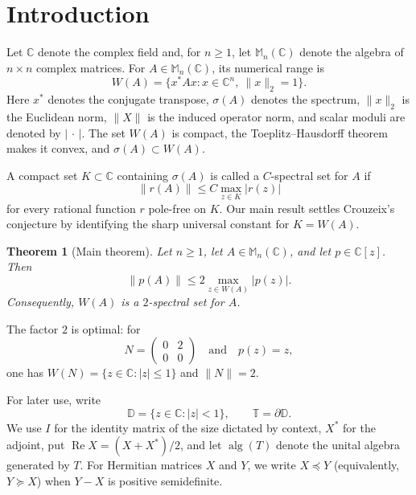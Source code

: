 \documentclass[preprints,article,submit,oneauthor]{Definitions/mdpi}
\newcounter{manuscriptresult}[section]
\theoremstyle{mdpi}
\newtheorem{theorem}[manuscriptresult]{Theorem}
\theoremstyle{definition}
\newcommand{\C}{\mathbb C}
\newcommand{\D}{\mathbb D}
\newcommand{\Torus}{\mathbb T}
\newcommand{\Mn}{\mathbb M_n(\C)}
\newcommand{\alg}{\operatorname{alg}}
\newcommand{\RePart}{\operatorname{Re}}
\begin{document}
\section{Introduction}
\label{sec:introduction}

Let $\C$ denote the complex field and, for $n\geq1$, let $\Mn$ denote
the algebra of $n\times n$ complex matrices.  For $A\in\Mn$, its
numerical range is
\begin{equation}
  W(A)=\{x^*Ax:x\in\C^n,\ \lVert x\rVert_2=1\}.
  \label{eq:numerical-range}
\end{equation}
Here $x^*$ denotes the conjugate transpose, $\sigma(A)$ denotes the
spectrum, $\lVert x\rVert_2$ is the Euclidean norm, $\lVert X\rVert$ is
the induced operator norm, and scalar moduli are denoted by
$\lvert\,\cdot\,\rvert$.  The set $W(A)$ is compact, the
Toeplitz--Hausdorff theorem makes it convex, and
$\sigma(A)\subset W(A)$.

A compact set $K\subset\C$ containing $\sigma(A)$ is called a
$C$-spectral set for $A$ if
\begin{equation}
  \lVert r(A)\rVert\leq C\max_{z\in K}\lvert r(z)\rvert
  \label{eq:spectral-set-definition}
\end{equation}
for every rational function $r$ pole-free on $K$.  Our main result
settles Crouzeix's conjecture by identifying the sharp universal
constant for $K=W(A)$.

\begin{theorem}[Main theorem]
\label{thm:main}
Let $n\geq1$, let $A\in\Mn$, and let $p\in\C[z]$.  Then
\begin{equation}
  \lVert p(A)\rVert
  \leq2\max_{z\in W(A)}\lvert p(z)\rvert.
  \label{eq:main-bound}
\end{equation}
Consequently, $W(A)$ is a $2$-spectral set for $A$.
\end{theorem}

The factor $2$ is optimal: for
\begin{equation}
  N=\begin{pmatrix}0&2\\0&0\end{pmatrix}
  \quad\text{and}\quad p(z)=z,
  \label{eq:sharp-example}
\end{equation}
one has $W(N)=\{z\in\C:\lvert z\rvert\leq1\}$ and
$\lVert N\rVert=2$.

For later use, write
\[
  \D=\{z\in\C:\lvert z\rvert<1\},
  \qquad
  \Torus=\partial\D.
\]
We use $I$ for the identity matrix of the size dictated by context,
$X^*$ for the adjoint, put $\RePart X=(X+X^*)/2$, and let $\alg(T)$
denote the unital algebra generated by $T$.  For Hermitian matrices
$X$ and $Y$, we write $X\preceq Y$ (equivalently, $Y\succeq X$) when
$Y-X$ is positive semidefinite.
\end{document}
